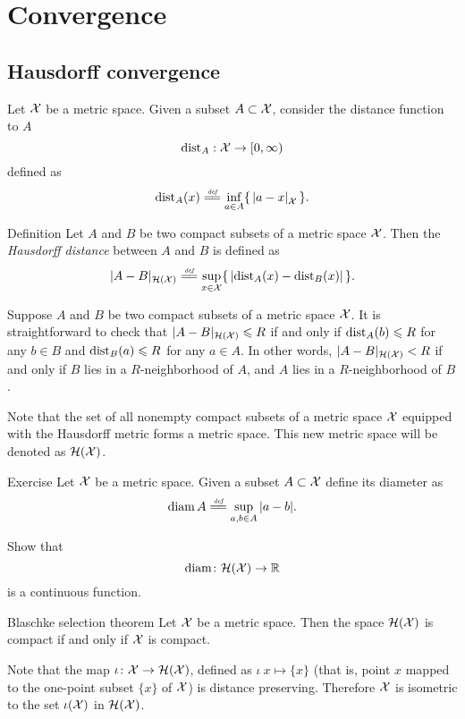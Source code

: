 \chapter{Convergence}

\section{Hausdorff convergence}

Let $\mathcal{X}$ be a metric space.
Given a subset $A\subset \mathcal{X}$,
consider the distance function to $A$
$$\mathrm{dist}_A: \mathcal{X} \to [0,\infty)$$
defined as 
$$\distfun_A(x)
\df
\inf_{a\in A}\{\,\dist ax{\spc{X}}\,\}.$$

\begin{thm}{Definition}\label{def:hausdorff-convergence}
Let $A$ and $B$ be two compact subsets of a metric space $\mathcal{X}$.
Then the \emph{Hausdorff distance} between $A$ and $B$ is defined as 
$$|A-B|_{\mathcal{H}(\spc{X})}
\df
\sup_{x\in \spc{X}}\{\,|\distfun_A(x)-\distfun_B(x)|\,\}.
$$

\end{thm}
 
Suppose $A$ and $B$ be two compact subsets of a metric space $\mathcal{X}$.
It is straightforward to check that $|A-B|_{\mathcal{H}(\mathcal{X})}\leqslant R$ if and only if 
$\mathrm{dist}_A(b)\leqslant R$ for any $b\in B$
and 
$\mathrm{dist}_B(a)\leqslant R$ for any $a\in A$.
In other words, $|A-B|_{\mathcal{H}(\mathcal{X})}< R$ if and only if 
$B$ lies in a $R$-neighborhood of $A$, 
and 
$A$ lies in a $R$-neighborhood of $B$.

Note that the set of all nonempty compact subsets of a metric space $\mathcal{X}$ equipped with the Hausdorff metric forms a metric space.
This new metric space will be denoted as $\mathcal{H}(\mathcal{X})$.


\begin{thm}{Exercise}\label{ex:diam}
Let $\mathcal{X}$ be a metric space.
Given a subset $A\subset \mathcal{X}$ define its diameter as 
$$\diam A\df\sup_{a,b\in A} |a-b|.$$

Show that 
$$\operatorname{\rm diam}\nolimits\colon\mathcal{H}(\mathcal{X})\to \mathbb{R}$$ 
is a continuous function.
\end{thm}


\begin{thm}{Blaschke selection theorem}\label{thm:compact+Hausdorff}
Let $\mathcal{X}$ be a metric space.
Then the space $\mathcal{H}(\mathcal{X})$ is compact if and only if $\mathcal{X}$ is compact.
\end{thm}

Note that the map $\iota\colon\mathcal{X}\to \mathcal{H}(\mathcal{X})$, defined as $\iota\:x\mapsto\{x\}$
(that is, point $x$ mapped to the one-point subset $\{x\}$ of $\mathcal{X}$)
is distance preserving.
Therefore $\mathcal{X}$ is isometric to the set $\iota(\mathcal{X})$ in $\mathcal{H}(\mathcal{X})$.

